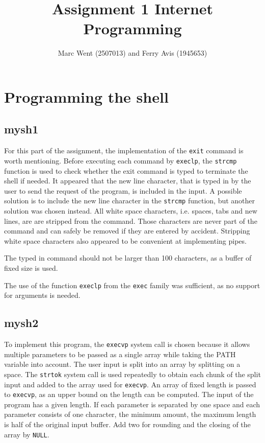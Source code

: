 \documentclass[11pt]{article}
\title{Assignment 1 Internet Programming}
\author{Marc Went (2507013) and Ferry Avis (1945653)}
\begin{document}
\maketitle

\section{Programming the shell}

\subsection{mysh1}

For this part of the assignment, the implementation of the \texttt{exit} command is worth mentioning. Before executing each command by \texttt{execlp}, the \texttt{strcmp} function is used to check whether the exit command is typed to terminate the shell if needed. It appeared that the new line character, that is typed in by the user to send the request of the program, is included in the input. A possible solution is to include the new line character in the \texttt{strcmp} function, but another solution was chosen instead. All white space characters, i.e. spaces, tabs and new lines, are are stripped from the command. Those characters are never part of the command and can safely be removed if they are entered by accident. Stripping white space characters also appeared to be convenient at implementing pipes.

The typed in command should not be larger than 100 characters, as a buffer of fixed size is used.

The use of the function \texttt{execlp} from the \texttt{exec} family was sufficient, as no support for arguments is needed.

\subsection{mysh2}

To implement this program, the \texttt{execvp} system call is chosen because it allows multiple parameters to be passed as a single array while taking the PATH variable into account. The user input is split into an array by splitting on a space. The \texttt{strtok} system call is used repeatedly to obtain each chunk of the split input and added to the array used for \texttt{execvp}.
An array of fixed length is passed to \texttt{execvp}, as an upper bound on the length can be computed. The input of the program has a given length. If each parameter is separated by one space and each parameter consists of one character, the minimum amount, the maximum length is half of the original input buffer. Add two for rounding and the closing of the array by \texttt{NULL}.
\end{document}
